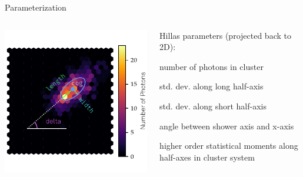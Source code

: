 \begin{frame}[t]{Parameterization}
\begin{columns}[onlytextwidth]
    \begin{column}{0.475\textwidth}
        \vspace{20px}
        \includegraphics[width=\textwidth]{fig/hillas_2.pdf}
    \end{column}
    \begin{column}{0.475\textwidth}
    Hillas parameters (projected back to 2D): \\
        \begin{description}
            \item[size] number of photons in cluster
            \item[length] std. dev. along long half-axis
            \item[width] std. dev. along short half-axis
            \item[delta] angle between shower axis and x-axis
            \item[skewness/ kurtosis] higher order statistical moments along half-axes in cluster system
        \end{description}
    \end{column}
\end{columns}
\end{frame}

